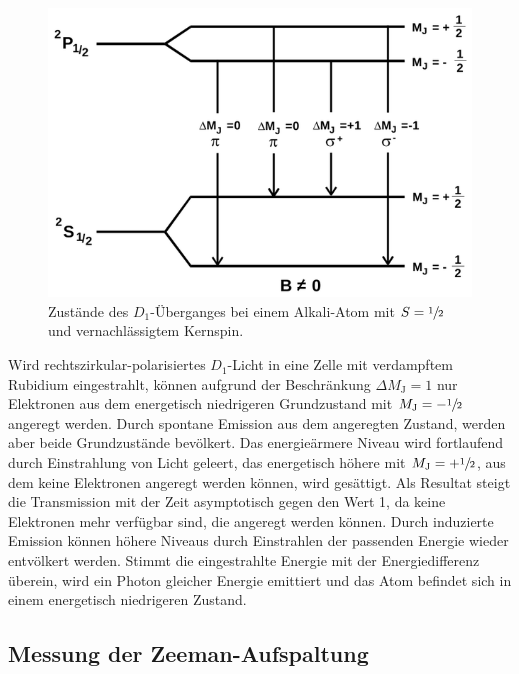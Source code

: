 \begin{figure}
  \centering
  \includegraphics{img/uebergang.png}
  \caption{Zustände des $D_1$-Überganges bei einem Alkali-Atom mit $S=\sfrac{1}{2}$ und
  vernachlässigtem Kernspin\cite{FP}.}
  \label{uebergang}
\end{figure}

Wird rechtszirkular-polarisiertes $D_1$-Licht in eine Zelle mit verdampftem Rubidium eingestrahlt,
können aufgrund der Beschränkung $\Delta M_\text{J} = 1$ nur Elektronen aus dem energetisch
niedrigeren Grundzustand mit $M_\text{J}=-\sfrac{1}{2}$ angeregt werden. Durch spontane Emission
aus dem angeregten Zustand, werden aber beide Grundzustände bevölkert. Das energieärmere Niveau
wird fortlaufend durch Einstrahlung von Licht geleert, das energetisch höhere mit
$M_\text{J}=+\sfrac{1}{2}$, aus dem keine Elektronen angeregt werden können, wird gesättigt.
Als Resultat steigt die Transmission mit der Zeit asymptotisch gegen den Wert 1, da keine
Elektronen mehr verfügbar sind, die angeregt werden können. Durch induzierte Emission können
höhere Niveaus durch Einstrahlen der passenden Energie wieder entvölkert werden. Stimmt die
eingestrahlte Energie mit der Energiedifferenz überein, wird ein Photon gleicher Energie
emittiert und das Atom befindet sich in einem energetisch niedrigeren Zustand.

\subsection{Messung der Zeeman-Aufspaltung}

